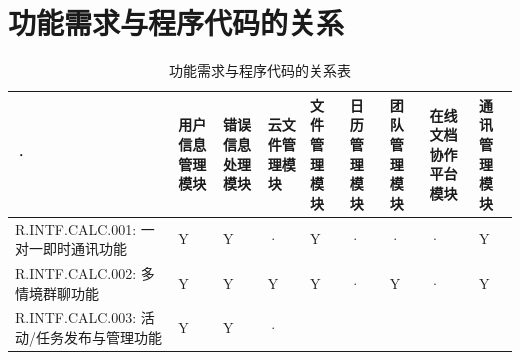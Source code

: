 \section{功能需求与程序代码的关系}
    \begin{table}[htbp]
        \centering
        \small
        \caption{功能需求与程序代码的关系表} \label{tab:requirement-module}
            \begin{tabular}{|p{9em}|p{2.5em}|p{2.5em}|p{2.5em}|p{2.5em}|p{2.5em}|
                            p{2.5em}|p{2.5em}|p{2.5em}|}
            \hline %
            ·   & 用户信息管理模块      & 错误信息处理模块  & 云文件管理模块 
                & 文件管理模块          & 日历管理模块      & 团队管理模块      
                & 在线文档协作平台模块  & 通讯管理模块\\
            \hline %
            R.INTF.CALC.001: 一对一即时通讯功能
                & Y                     & Y                 & · 
                & Y                     & ·                 & · 
                & ·                     & Y                 \\
            \hline  %
            R.INTF.CALC.002: 多情境群聊功能
                & Y                     & Y                 & Y
                & Y                     & ·                 & Y 
                & ·                     & Y                 \\
            \hline %
            R.INTF.CALC.003: 活动/任务发布与管理功能
                & Y                     & Y                 & · 

\end{tabular}
\end{table}
